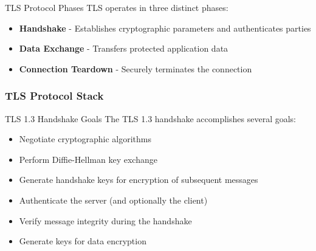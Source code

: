 \begin{definition}{TLS Protocol Phases}
TLS operates in three distinct phases:
\begin{itemize}
    \item \textbf{Handshake} - Establishes cryptographic parameters and authenticates parties
    \item \textbf{Data Exchange} - Transfers protected application data
    \item \textbf{Connection Teardown} - Securely terminates the connection
\end{itemize}
\end{definition}

\multend



\subsubsection{TLS Protocol Stack}





\begin{concept}{TLS 1.3 Handshake Goals}
The TLS 1.3 handshake accomplishes several goals:
\begin{itemize}
    \item Negotiate cryptographic algorithms
    \item Perform Diffie-Hellman key exchange
    \item Generate handshake keys for encryption of subsequent messages
    \item Authenticate the server (and optionally the client)
    \item Verify message integrity during the handshake
    \item Generate keys for data encryption
\end{itemize}
\end{concept}

